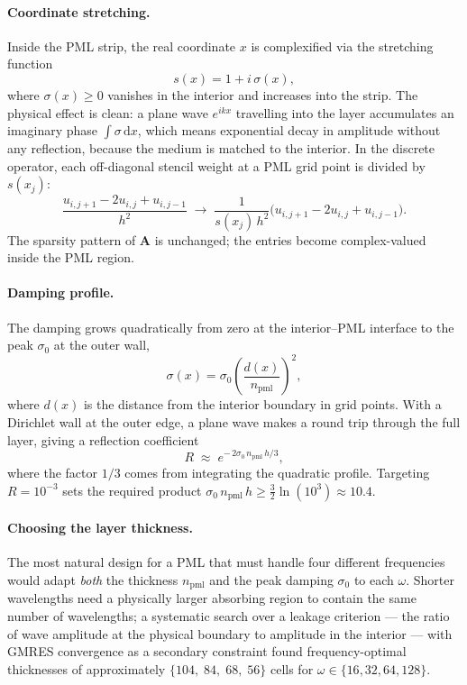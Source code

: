 \paragraph{Coordinate stretching.}
Inside the PML strip, the real coordinate $x$ is complexified via
the stretching function
\begin{equation}
    s(x) = 1 + i\,\sigma(x),
    \label{eq:stretching}
\end{equation}
where $\sigma(x) \geq 0$ vanishes in the interior and increases
into the strip. The physical effect is clean: a plane wave
$e^{ikx}$ travelling into the layer accumulates an imaginary
phase $\int\sigma\,\mathrm{d}x$, which means exponential decay
in amplitude without any reflection, because the medium is
matched to the interior. In the discrete operator, each
off-diagonal stencil weight at a PML grid point is divided
by $s(x_j)$:
\begin{equation}
    \frac{u_{i,j+1} - 2u_{i,j} + u_{i,j-1}}{h^2}
    \;\longrightarrow\;
    \frac{1}{s(x_j)\,h^2}
    \bigl(u_{i,j+1} - 2u_{i,j} + u_{i,j-1}\bigr).
\end{equation}
The sparsity pattern of $\mathbf{A}$ is unchanged; the entries
become complex-valued inside the PML region.

\paragraph{Damping profile.}
The damping grows quadratically from zero at the interior--PML
interface to the peak $\sigma_0$ at the outer wall,
\begin{equation}
    \sigma(x)
    = \sigma_0\!\left(\frac{d(x)}{n_{\mathrm{pml}}}\right)^{\!2},
    \label{eq:pml_profile}
\end{equation}
where $d(x)$ is the distance from the interior boundary in grid
points. With a Dirichlet wall at the outer edge, a plane wave
makes a round trip through the full layer, giving a reflection
coefficient
\begin{equation}
    R \;\approx\; e^{-\,2\sigma_0\,n_{\mathrm{pml}}\,h/3},
    \label{eq:R_formula}
\end{equation}
where the factor $1/3$ comes from integrating the quadratic
profile. Targeting $R = 10^{-3}$ sets the required product
$\sigma_0\,n_{\mathrm{pml}}\,h \geq \tfrac{3}{2}\ln(10^3) \approx 10.4$.

\paragraph{Choosing the layer thickness.}
The most natural design for a PML that must handle four
different frequencies would adapt \emph{both} the thickness
$n_{\mathrm{pml}}$ and the peak damping $\sigma_0$ to each
$\omega$. Shorter wavelengths need a physically larger absorbing
region to contain the same number of wavelengths; a systematic
search over a leakage criterion --- the ratio of wave amplitude
at the physical boundary to amplitude in the interior --- with
GMRES convergence as a secondary constraint found
frequency-optimal thicknesses of approximately
$\{104,\;84,\;68,\;56\}$ cells for $\omega \in \{16,32,64,128\}$.

